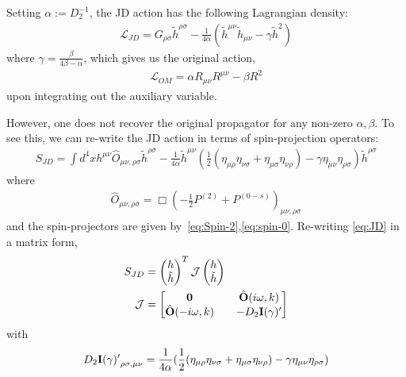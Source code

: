 \documentclass[aps,preprintnumbers,superscriptaddress,longbibliography]{revtex4-1}
\begin{document}
Setting $\alpha:=D_2^{-1}$, the JD action has the following Lagrangian density:
\begin{align}
\label{eq:ACTIONJD}     \mathcal{L}_{JD}=G_{\rho\sigma}\tilde{h}^{\rho\sigma}-\frac{1}{4\alpha}(\tilde{h}^{\mu\nu}\tilde{h}_{\mu\nu}-\gamma \tilde{h}^2)
\end{align}
where $\gamma=\frac{\beta}{4\beta-\alpha}$, which gives us the original action,
\begin{align}
     \mathcal{L}_{OM}=\alpha R_{\mu\nu}R^{\mu\nu}-\beta R^2
\end{align}upon integrating out the auxiliary variable.


However, one does not recover the original propagator for any non-zero $\alpha,\beta$. To see this, we can re-write the JD action in terms of spin-projection operators:
\begin{align}
\label{eq:JD}
    S_{JD}=\int d^4x h^{\mu\nu}\hat{O}_{\mu\nu,\rho\sigma}\tilde{h}^{\rho\sigma}-\frac{1}{4\alpha}\tilde{h}^{\mu\nu}(\frac{1}{2}(\eta_{\mu\rho}\eta_{\nu\sigma}+\eta_{\mu\sigma}\eta_{\nu\rho})-\gamma\eta_{\mu\nu}\eta_{\rho\sigma} )\tilde{h}^{\rho\sigma}
\end{align}
where 
\begin{align}
      \hat{O}_{\mu\nu,\rho\sigma}=\Box(-\frac{1}{2}P^{(2)}+P^{(0-s)})_{\mu\nu,\rho\sigma} 
\end{align} and the spin-projectors are given by~\eqref{eq:Spin-2},\eqref{eq:spin-0}. Re-writing \eqref{eq:JD} in a matrix form,
\begin{align}
\begin{split}
    \label{eq:MJD}
    S_{JD}&=\begin{pmatrix}h \\ \tilde{h}\end{pmatrix}^T \mathcal{J} \begin{pmatrix}h \\ \tilde{h}\end{pmatrix}\\
  \mathcal{J}&=  
\begin{bmatrix}
    \bf0 &&\hat{\bf O}(i\omega,k)\\\hat{\bf O}(-i\omega,k) && -D_2\bf I(\gamma)'
\end{bmatrix}
\end{split}
\end{align}
with
\begin{align}
   D_2{\bf I(\gamma)'}_{\rho\sigma,\mu\nu}= \frac{1}{4\alpha}(\frac{1}{2}(\eta_{\mu\rho}\eta_{\nu\sigma}+\eta_{\mu\sigma}\eta_{\nu\rho})-\gamma\eta_{\mu\nu}\eta_{\rho\sigma} )
    \end{align}
\end{document}
